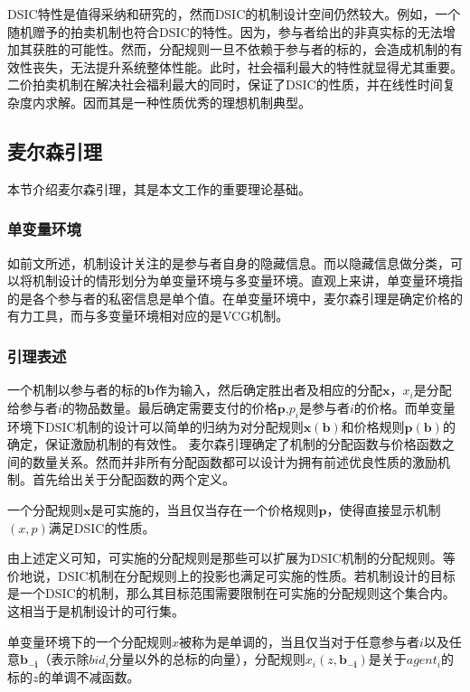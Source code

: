 \documentclass[promaster]{thesis-uestc}
\begin{document}
DSIC特性是值得采纳和研究的，然而DSIC的机制设计空间仍然较大。例如，一个随机赠予的拍卖机制也符合DSIC的特性。因为，参与者给出的非真实标的无法增加其获胜的可能性。然而，分配规则一旦不依赖于参与者的标的，会造成机制的有效性丧失，无法提升系统整体性能。此时，社会福利最大的特性就显得尤其重要。二价拍卖机制在解决社会福利最大的同时，保证了DSIC的性质，并在线性时间复杂度内求解。因而其是一种性质优秀的理想机制典型。

\subsection{麦尔森引理}
本节介绍麦尔森引理，其是本文工作的重要理论基础。
\subsubsection{单变量环境}

如前文所述，机制设计关注的是参与者自身的隐藏信息。而以隐藏信息做分类，可以将机制设计的情形划分为单变量环境与多变量环境。直观上来讲，单变量环境指的是各个参与者的私密信息是单个值。在单变量环境中，麦尔森引理是确定价格的有力工具，而与多变量环境相对应的是VCG机制。

\subsubsection{引理表述}

一个机制以参与者的标的$\mathbf{b}$作为输入，然后确定胜出者及相应的分配$\mathbf{x}$，$x_i$是分配给参与者$i$的物品数量。最后确定需要支付的价格$\mathbf{p}$,$p_i$是参与者$i$的价格。而单变量环境下DSIC机制的设计可以简单的归纳为对分配规则$\mathbf{x(b)}$和价格规则$\mathbf{p(b)}$的确定，保证激励机制的有效性。
麦尔森引理确定了机制的分配函数与价格函数之间的数量关系。然而并非所有分配函数都可以设计为拥有前述优良性质的激励机制。首先给出关于分配函数的两个定义。

\begin{definition}[可实施的分配规则]
一个分配规则$\mathbf{x}$是可实施的，当且仅当存在一个价格规则$\mathbf{p}$，使得直接显示机制$(x,p)$满足DSIC的性质。
\end{definition}

由上述定义可知，可实施的分配规则是那些可以扩展为DSIC机制的分配规则。等价地说，DSIC机制在分配规则上的投影也满足可实施的性质。若机制设计的目标是一个DSIC的机制，那么其目标范围需要限制在可实施的分配规则这个集合内。这相当于是机制设计的可行集。

\begin{definition}[单调分配规则]
    单变量环境下的一个分配规则$x$被称为是单调的，当且仅当对于任意参与者$i$以及任意$\mathbf{b_{-i}}$（表示除$bid_i$分量以外的总标的向量），分配规则$x_i(z,\mathbf{b_{-i}})$是关于$agent_i$的标的$z$的单调不减函数。
\end{definition}
\end{document}
